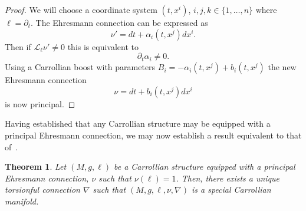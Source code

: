 \documentclass{article}
\newtheorem{theorem}{Theorem}[section]
\theoremstyle{definition}
\theoremstyle{remark}
\begin{document}
\begin{proof}
    We will choose a coordinate system $(t, x^i)$, $i,j,k \in \{ 1,\ldots, n\}$ where $\ell = \partial_t$. The Ehresmann connection can be expressed as
    \begin{equation}
        \nu' = dt + \alpha_i(t, x^j) dx^i. \nonumber
    \end{equation}
    Then if $\mathcal{L}_{\ell} \nu' \neq 0$ this is equivalent to 
    \begin{equation}
        \partial_t \alpha_i \neq 0.
    \end{equation}
    Using a Carrollian boost with parameters $B_i = -\alpha_i(t,x^j) + b_i(t,x^j)$ the new Ehresmann connection $$ \nu = dt + b_i(t,x^j) dx^i$$ is now principal. 
\end{proof}

Having established that any Carrollian structure may be equipped with a principal Ehresmann connection, we may now establish a result equivalent to that of~\cite[Proposition A.21]{bekaert2018connections}.

\begin{theorem} \label{thm:preBM}
    Let $(M, g, \ell)$ be a Carrollian structure equipped with a principal Ehresmann connection, $\nu$ such that $\nu(\ell)=1$. Then, there exists a unique torsionful connection $\nabla$ such that $(M,g,\ell,\nu,\nabla)$ is a special Carrollian manifold.
\end{theorem}
\end{document}
